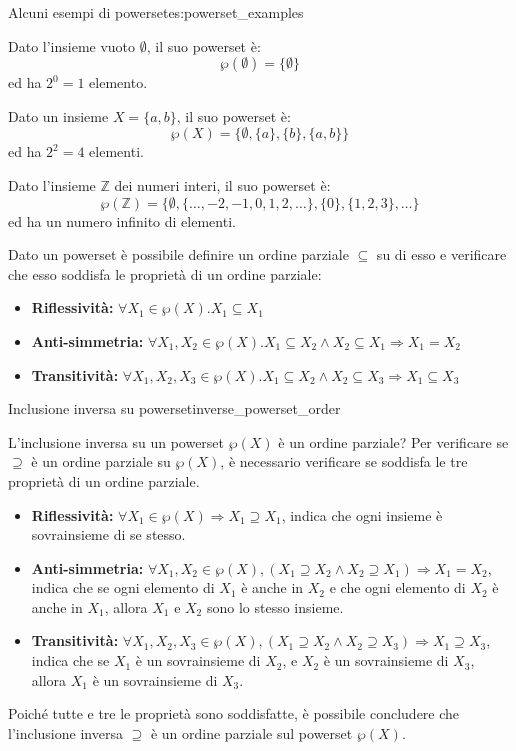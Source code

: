 \begin{esempio}{Alcuni esempi di powerset}{es:powerset_examples}

    Dato l'insieme vuoto $\emptyset$, il suo powerset è:
    \[\wp(\emptyset) = \{\emptyset\}\]
    ed ha $2^0 = 1$ elemento.

    Dato un insieme $X = \{a, b\}$, il suo powerset è:
    \[\wp(X) = \{\emptyset, \{a\}, \{b\}, \{a, b\}\}\]
    ed ha $2^2 = 4$ elementi.

    Dato l'insieme $\mathbb{Z}$ dei numeri interi, il suo powerset è:
    \[\wp(\mathbb{Z}) = \{\emptyset, \{\ldots, -2, -1, 0, 1, 2,
    \ldots\}, \{0\}, \{1, 2, 3\}, \ldots\}\]
    ed ha un numero infinito di elementi.

\end{esempio}

Dato un powerset è possibile definire un ordine parziale $\subseteq$ su di
esso e verificare che esso soddisfa le proprietà di un ordine parziale:

\begin{itemize}
    \item \textbf{Riflessività:} $\forall X_{1}\in \wp(X). X_{1}\subseteq X_{1}$
    \item \textbf{Anti-simmetria:} $\forall X_{1},X_{2}\in\wp(X).X_{1}\subseteq X_{2}\wedge X_{2}\subseteq X_{1}\Rightarrow X_{1}=X_{2}$
    \item \textbf{Transitività:} $\forall X_{1},X_{2},X_{3}\in\wp(X).X_{1}\subseteq X_{2}\wedge X_{2}\subseteq X_{3}\Rightarrow X_{1}\subseteq X_{3}$
\end{itemize}


\begin{esercizio}{Inclusione inversa su powerset}{inverse_powerset_order}

L'inclusione inversa su un powerset $\wp(X)$ è un ordine parziale?
Per verificare se $\supseteq$ è un ordine parziale su $\wp(X)$,
è necessario verificare se soddisfa le tre proprietà di un ordine parziale.

\begin{itemize}
    \item \textbf{Riflessività:} $\forall X_1 \in \wp(X) \Rightarrow
    X_1 \supseteq X_1$, indica che ogni insieme è sovrainsieme di se stesso.
    \item \textbf{Anti-simmetria:} $\forall X_1, X_2 \in \wp(X),
    (X_1 \supseteq X_2 \wedge X_2 \supseteq X_1) \Rightarrow X_1 = X_2$,
    indica che se ogni elemento di $X_1$ è anche in $X_2$ e che ogni elemento di
    $X_2$ è anche in $X_1$, allora $X_1$ e $X_2$ sono lo stesso insieme.
    \item \textbf{Transitività:} $\forall X_1, X_2, X_3 \in \wp(X),
    (X_1 \supseteq X_2 \wedge X_2 \supseteq X_3) \Rightarrow X_1 \supseteq X_3$,
    indica che se $X_1$ è un sovrainsieme di $X_2$, e $X_2$ è un sovrainsieme di
    $X_3$, allora $X_1$ è un sovrainsieme di $X_3$.
\end{itemize}

Poiché tutte e tre le proprietà sono soddisfatte, è possibile concludere che
l'inclusione inversa $\supseteq$ è un ordine parziale sul powerset
$\wp(X)$.

\end{esercizio}

